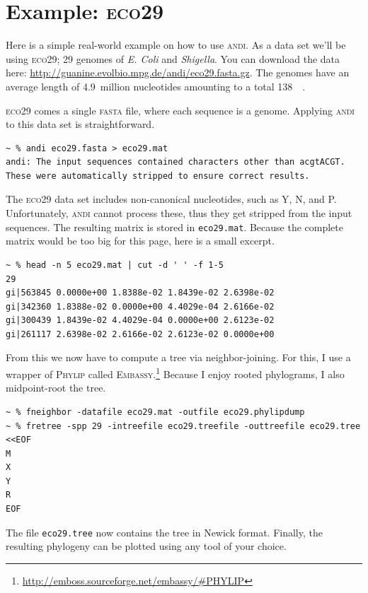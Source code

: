 \documentclass[a4paper,
  10pt,
  english,
  DIV=12,
  BCOR=8mm]{scrbook}
\newcommand{\algo}[1]{\textsc{{#1}}}
\newcommand{\andi}{\algo{andi} }
\newcommand{\word}[1]{\textsf{\small#1}}
\begin{document}
\section{Example: \algo{eco29}}

Here is a simple real-world example on how to use \algo{andi}. As a data set we'll be using \algo{eco29}; 29 genomes of \textit{E. Coli} and \textit{Shigella}. You can download the data here: {\small{\url{http://guanine.evolbio.mpg.de/andi/eco29.fasta.gz}}}. The genomes have an average length of 4.9~million nucleotides amounting to a total \SI{138}{\mega\byte}.

\algo{eco29} comes a single \algo{fasta} file, where each sequence is a genome. Applying \andi to this data set is straightforward.

\begin{lstlisting}
~ % andi eco29.fasta > eco29.mat
andi: The input sequences contained characters other than acgtACGT. These were automatically stripped to ensure correct results.
\end{lstlisting}

\noindent The \algo{eco29} data set includes non-canonical nucleotides, such as \word{Y}, \word{N}, and \word{P}. Unfortunately, \andi cannot process these, thus they get stripped from the input sequences. The resulting matrix is stored in \lstinline$eco29.mat$. Because the complete matrix would be too big for this page, here is a small excerpt.

\begin{lstlisting}
~ % head -n 5 eco29.mat | cut -d ' ' -f 1-5
29
gi|563845 0.0000e+00 1.8388e-02 1.8439e-02 2.6398e-02
gi|342360 1.8388e-02 0.0000e+00 4.4029e-04 2.6166e-02
gi|300439 1.8439e-02 4.4029e-04 0.0000e+00 2.6123e-02
gi|261117 2.6398e-02 2.6166e-02 2.6123e-02 0.0000e+00
\end{lstlisting}

\noindent From this we now have to compute a tree via neighbor-joining. For this, I use a wrapper of \algo{Phylip} called \algo{Embassy}.\footnote{\url{http://emboss.sourceforge.net/embassy/\#PHYLIP}} Because I enjoy rooted phylograms, I also midpoint-root the tree.

\begin{lstlisting}
~ % fneighbor -datafile eco29.mat -outfile eco29.phylipdump
~ % fretree -spp 29 -intreefile eco29.treefile -outtreefile eco29.tree <<EOF
M
X
Y
R
EOF
\end{lstlisting}

\noindent The file \lstinline$eco29.tree$ now contains the tree in Newick format. Finally, the resulting phylogeny can be plotted using any tool of your choice. 
\end{document}
